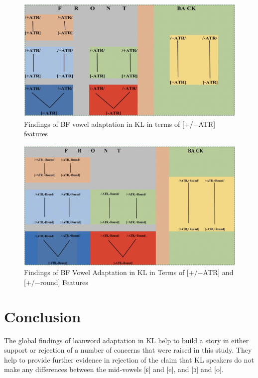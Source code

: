 \documentclass[output=paper]{langscibook}
\begin{document}
\begin{figure}
    \includegraphics[width=\textwidth]{figures/kabasele-figure3.png}
    \caption{Findings of BF vowel adaptation in KL in terms of [+/−ATR] features}
    \label{fig:3}
\end{figure}

\begin{figure}
    \includegraphics[width=\textwidth]{figures/kabasele-figure4.png}
    \caption{Findings of BF Vowel Adaptation in KL in Terms of [+/−ATR] and [+/−round] Features}
    \label{fig:4}
\end{figure}

\section{Conclusion}
The global findings of loanword adaptation in KL help to build a story in either support or rejection of a number of concerns that were raised in this study. They help to provide further evidence in rejection of the claim that KL speakers do not make any differences between the mid-vowels [ɛ] and [e], and [ɔ] and [o].
\end{document}
